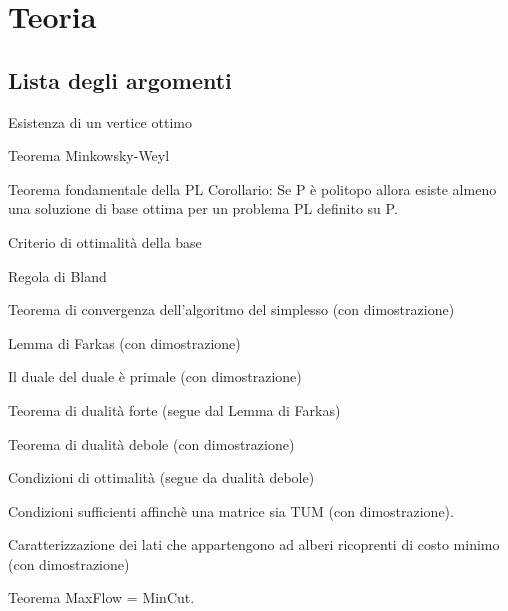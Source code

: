 \documentclass[\main/main.tex]{subfiles}
\begin{document}
\chapter{Teoria}

\section{Lista degli argomenti}
\begin{todolist}
  \item Esistenza di un vertice ottimo
  \item Teorema Minkowsky-Weyl
  \item Teorema fondamentale della PL
  \subitem Corollario: Se P è politopo allora esiste almeno una soluzione di base ottima per un problema PL definito su P.
  \item Criterio di ottimalità della base
  \item Regola di Bland
  \item Teorema di convergenza dell'algoritmo del simplesso (con dimostrazione)
  \item Lemma di Farkas (con dimostrazione)
  \item Il duale del duale è primale (con dimostrazione)
  \item Teorema di dualità forte (segue dal Lemma di Farkas)
  \item Teorema di dualità debole (con dimostrazione)
  \item Condizioni di ottimalità (segue da dualità debole)
  \item Condizioni sufficienti affinchè una matrice sia TUM (con dimostrazione).
  \item Caratterizzazione dei lati che appartengono ad alberi ricoprenti di costo minimo (con dimostrazione)
  \item Teorema MaxFlow = MinCut.
\end{todolist}





\clearpage


\clearpage





\clearpage



\end{document}
